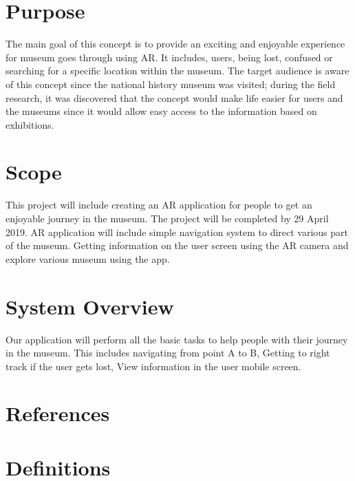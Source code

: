 
\section{Purpose}
The main goal of this concept is to provide an exciting and enjoyable experience for museum goes through using AR. It includes, users, being lost, confused or searching for a specific location within the museum. The target audience is aware of this concept since the national history museum was visited; during the field research, it was discovered that the concept would make life easier for users and the museums since it would allow easy access to the information based on exhibitions.

\section{Scope}
This project will include creating an AR application for people to get an enjoyable journey in the museum. The project will be completed by 29 April 2019. AR application will include simple navigation system to direct various part of the museum. Getting information on the user screen using the AR camera and explore various museum using the app. 

\section{System Overview}
Our application will perform all the basic tasks to help people with their journey in the museum. This includes navigating from point A to B, Getting to right track if the user gets lost, View information in the user mobile screen.

\section{References}

\section{Definitions}

